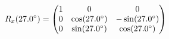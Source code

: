 \documentclass[preview]{standalone}
\begin{document}
\begin{align*}
\special{dvisvgm:raw <g id='unique000'>}R_x(27.0^\circ) = \begin{pmatrix} 1 & 0 & 0 \\ 0 & \cos(27.0^\circ) & -\sin(27.0^\circ) \\ 0 & \sin(27.0^\circ) & \cos(27.0^\circ) \end{pmatrix}\special{dvisvgm:raw </g>}
\end{align*}
\end{document}
